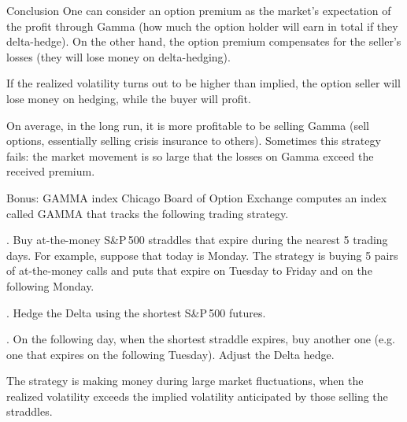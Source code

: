 \documentclass{beamer}
\begin{document}
\begin{frame}{Conclusion}
\justify
One can consider an option premium as the market's expectation of the profit through Gamma (how much the option holder will earn in total if they delta-hedge). On the other hand, the option premium compensates for the seller's losses (they will lose money on delta-hedging).

\justify
If the realized volatility turns out to be higher than implied, the option seller will lose money on hedging, while the buyer will profit.

\justify
On average, in the long run, it is more profitable to be selling Gamma (sell options, essentially selling crisis insurance to others). Sometimes this strategy fails: the market movement is so large that the losses on Gamma exceed the received premium.
\end{frame}


\begin{frame}{Bonus: GAMMA index}
\justify
Chicago Board of Option Exchange computes an index called \alert{GAMMA} that tracks the following trading strategy.

. Buy at-the-money S\&P\,500 straddles that expire during the nearest 5 trading days. For example, suppose that today is Monday. The strategy is buying 5 pairs of at-the-money calls and puts that expire on Tuesday to Friday and on the following Monday.

. Hedge the Delta using the shortest S\&P\,500 futures.

. On the following day, when the shortest straddle expires, buy another one (e.g. one that expires on the following Tuesday). Adjust the Delta hedge.

\justify
The strategy is making money during large market fluctuations, when the realized volatility exceeds the implied volatility anticipated by those selling the straddles.
\end{frame}
\end{document}
